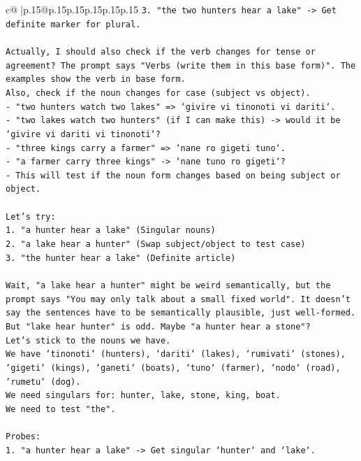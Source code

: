 \documentclass{article}
\begin{document}
{\begin{supertabular}{c@{$\;$}|p{.15\linewidth}@{}p{.15\linewidth}p{.15\linewidth}p{.15\linewidth}p{.15\linewidth}p{.15\linewidth}}
{{{\texttt{3. "the two hunters hear a lake" {-}> Get definite marker for plural.} \\
\\ 
\texttt{Actually, I should also check if the verb changes for tense or agreement? The prompt says "Verbs (write them in this base form)". The examples show the verb in base form.} \\
\texttt{Also, check if the noun changes for case (subject vs object).} \\
\texttt{{-} "two hunters watch two lakes" => `givire vi tinonoti vi dariti`.} \\
\texttt{{-} "two lakes watch two hunters" (if I can make this) {-}> would it be `givire vi dariti vi tinonoti`?} \\
\texttt{{-} "three kings carry a farmer" => `nane ro gigeti tuno`.} \\
\texttt{{-} "a farmer carry three kings" {-}> `nane tuno ro gigeti`?} \\
\texttt{{-} This will test if the noun form changes based on being subject or object.} \\
\\ 
\texttt{Let's try:} \\
\texttt{1. "a hunter hear a lake" (Singular nouns)} \\
\texttt{2. "a lake hear a hunter" (Swap subject/object to test case)} \\
\texttt{3. "the hunter hear a lake" (Definite article)} \\
\\ 
\texttt{Wait, "a lake hear a hunter" might be weird semantically, but the prompt says "You may only talk about a small fixed world". It doesn't say the sentences have to be semantically plausible, just well{-}formed. But "lake hear hunter" is odd. Maybe "a hunter hear a stone"?} \\
\texttt{Let's stick to the nouns we have.} \\
\texttt{We have `tinonoti` (hunters), `dariti` (lakes), `rumivati` (stones), `gigeti` (kings), `ganeti` (boats), `tuno` (farmer), `nodo` (road), `rumetu` (dog).} \\
\texttt{We need singulars for: hunter, lake, stone, king, boat.} \\
\texttt{We need to test "the".} \\
\\ 
\texttt{Probes:} \\
\texttt{1. "a hunter hear a lake" {-}> Get singular `hunter` and `lake`.} \\
}}}
\end{supertabular}}
\end{document}
